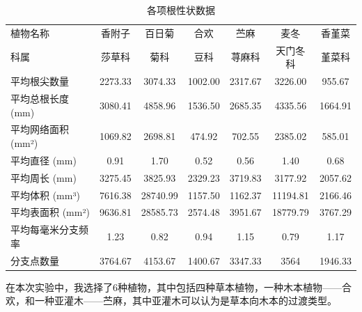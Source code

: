 \documentclass[10.5pt]{config}
\begin{document}
\begin{table}[htbp]
\centering
\caption{各项根性状数据}
\label{tab:root_parameters_vertical}
\renewcommand{\arraystretch}{1.5} %
\setlength{\tabcolsep}{6pt}        %
\begin{tabular}{lcccccc}
\toprule
植物名称 & 香附子 & 百日菊 & 合欢 & 苎麻 & 麦冬 & 香堇菜 \\
科属 & 莎草科 & 菊科 & 豆科 & 荨麻科 & 天门冬科 & 堇菜科\\
\midrule
平均根尖数量 & 2273.33 & 3074.33 & 1002.00 & 2317.67 & 3226.00 & 955.67 \\
平均总根长度 (mm) & 3080.41 & 4858.96 & 1536.50 & 2685.35 & 4335.56 & 1664.91 \\
平均网络面积 (mm²) & 1069.82 & 2698.81 & 474.92 & 702.55 & 2385.02 & 585.01 \\
平均直径 (mm) & 0.91 & 1.70 & 0.52 & 0.56 & 1.40 & 0.68 \\
平均周长 (mm) & 3275.45 & 3825.93 & 2329.23 & 3719.83 & 3177.92 & 2057.62 \\
平均体积 (mm³) & 7616.38 & 28740.99 & 1157.50 & 1162.37 & 11194.81 & 2166.46 \\
平均表面积 (mm²) & 9636.81 & 28585.73 & 2574.48 & 3951.67 & 18779.79 & 3767.29 \\
平均每毫米分支频率 &1.23 &0.82 &0.94& 1.15&0.79&1.17\\
分支点数量 & 3764.67 &4153.67 & 1400.67 & 3347.33 & 3564 & 1946.33\\

\bottomrule

\end{tabular}

\end{table}

在本次实验中，我选择了6种植物，其中包括四种草本植物，一种木本植物——合欢，和一种亚灌木——苎麻，其中亚灌木可以认为是草本向木本的过渡类型。
\end{document}
